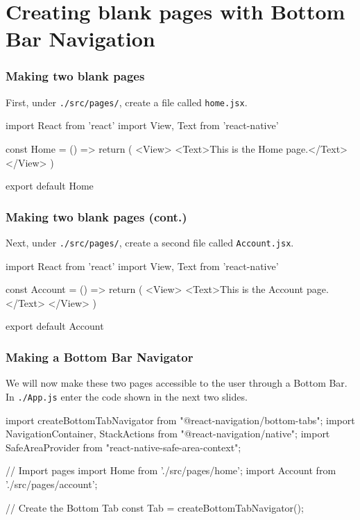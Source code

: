 \documentclass{beamer}
\begin{document}
  \section{Creating blank pages with Bottom Bar Navigation}
  \begin{frame}[fragile]
    \frametitle{Making two blank pages}
    First, under \verb|./src/pages/|, create a file called \verb|home.jsx|.
    \begin{jscode}
import React from 'react'
import {View, Text} from 'react-native'

const Home = () => {
  return (
    <View>
      <Text>This is the Home page.</Text>
    </View>
  )
}

export default Home
    \end{jscode}

  \end{frame}
  \begin{frame}[fragile]
    \frametitle{Making two blank pages (cont.)}
    Next, under \verb|./src/pages/|, create a second file called \verb|Account.jsx|.
    \begin{jscode}
import React from 'react'
import {View, Text} from 'react-native'

const Account = () => {
  return (
    <View>
      <Text>This is the Account page.</Text>
    </View>
  )
}

export default Account
    \end{jscode}

  \end{frame}

  \begin{frame}[fragile]
    \frametitle{Making a Bottom Bar Navigator}
    We will now make these two pages accessible to the user through a Bottom Bar. 
    In \verb|./App.js| enter the code shown in the next two slides.
    \begin{jscodesmall}
import { createBottomTabNavigator } from "@react-navigation/bottom-tabs";
import { NavigationContainer, StackActions } from "@react-navigation/native";
import { SafeAreaProvider } from "react-native-safe-area-context";

// Import pages
import Home from './src/pages/home';
import Account from './src/pages/account';

// Create the Bottom Tab
const Tab = createBottomTabNavigator();
    \end{jscodesmall}

  \end{frame}
\end{document}
